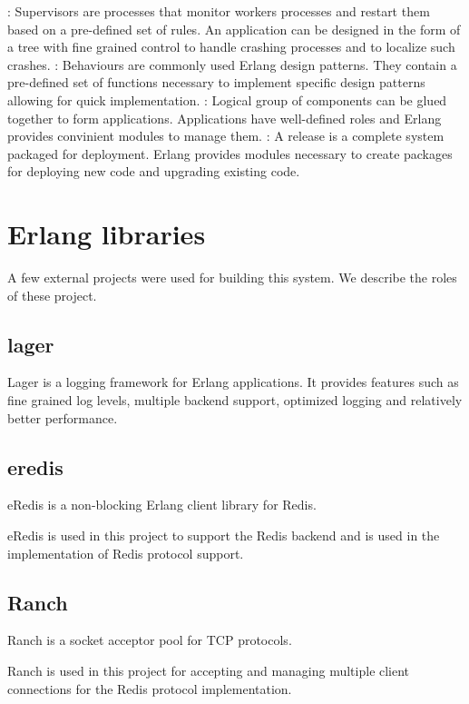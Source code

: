 \begin{itemize}
    : Supervisors are processes that monitor workers 
    processes and restart them based on a pre-defined set of rules. An 
    application can be designed in the form of a tree with fine grained
    control to handle crashing processes and to localize such crashes.
    : Behaviours are commonly used Erlang design patterns.
    They contain a pre-defined set of functions necessary to implement
    specific design patterns allowing for quick implementation.
    : Logical group of components can be glued together
    to form applications. Applications have well-defined roles and Erlang
    provides convinient modules to manage them.
    : A release is a complete system packaged for deployment.
    Erlang provides modules necessary to create packages for deploying new
    code and upgrading existing code.
\end{itemize}


\section{Erlang libraries}

A few external projects were used for building this system. We describe the
roles of these project.

\subsection{lager}

Lager \citep{lager} is a logging framework for Erlang applications. It provides
features such as fine grained log levels, multiple backend support, optimized
logging and relatively better performance.

\subsection{eredis}

eRedis \citep{eredis} is a non-blocking Erlang client library for Redis.

eRedis is used in this project to support the Redis backend and is used in the
implementation of Redis protocol support.

\subsection{Ranch}

Ranch \citep{ranch} is a socket acceptor pool for TCP protocols.

Ranch is used in this project for accepting and managing multiple client 
connections for the Redis protocol implementation.

